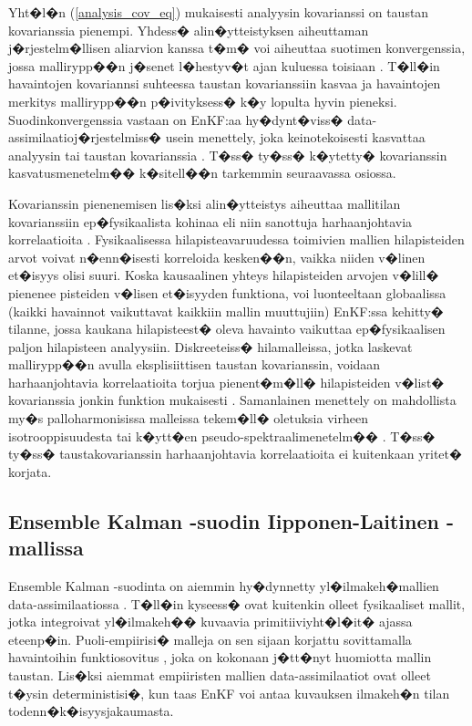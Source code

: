 \documentclass[12pt,a4paper,finnish,margin=2in]{article}
\begin{document}
Yht�l�n (\ref{analysis_cov_eq}) mukaisesti analyysin kovarianssi on taustan kovarianssia pienempi. Yhdess� alin�ytteistyksen aiheuttaman j�rjestelm�llisen aliarvion kanssa t�m� voi aiheuttaa suotimen konvergenssia, jossa mallirypp��n j�senet l�hestyv�t ajan kuluessa toisiaan \citep[esim.][]{hamill_2001}. T�ll�in havaintojen kovariannsi suhteessa taustan kovarianssiin kasvaa ja havaintojen merkitys mallirypp��n p�ivityksess� k�y lopulta hyvin pieneksi. Suodinkonvergenssia vastaan on EnKF:aa hy�dynt�viss� data-assimilaatioj�rjestelmiss� usein menettely, joka keinotekoisesti kasvattaa analyysin tai taustan kovarianssia \citep{whitaker_2002}. T�ss� ty�ss� k�ytetty� kovarianssin kasvatusmenetelm�� k�sitell��n tarkemmin seuraavassa osiossa.

Kovarianssin pienenemisen lis�ksi alin�ytteistys aiheuttaa mallitilan kovarianssiin ep�fysikaalista kohinaa eli niin sanottuja harhaanjohtavia korrelaatioita \citep{evensen_2003}. Fysikaalisessa hilapisteavaruudessa toimivien mallien hilapisteiden arvot voivat n�enn�isesti korreloida kesken��n, vaikka niiden v�linen et�isyys olisi suuri. Koska kausaalinen yhteys hilapisteiden arvojen v�lill� pienenee pisteiden v�lisen et�isyyden funktiona, voi luonteeltaan globaalissa (kaikki havainnot vaikuttavat kaikkiin mallin muuttujiin) EnKF:ssa kehitty� tilanne, jossa kaukana hilapisteest� oleva havainto vaikuttaa ep�fysikaalisen paljon hilapisteen analyysiin. Diskreeteiss� hilamalleissa, jotka laskevat mallirypp��n avulla eksplisiittisen taustan kovarianssin, voidaan harhaanjohtavia korrelaatioita torjua pienent�m�ll� hilapisteiden v�list� kovarianssia jonkin funktion mukaisesti \citep{houtekamer_2001}. Samanlainen menettely on mahdollista my�s palloharmonisissa malleissa tekem�ll� oletuksia virheen isotrooppisuudesta tai k�ytt�en pseudo-spektraalimenetelm�� \citep{buehner_2012}. T�ss� ty�ss� taustakovarianssin harhaanjohtavia korrelaatioita ei kuitenkaan yritet� korjata.

\subsection{Ensemble Kalman -suodin Iipponen-Laitinen -mallissa}

Ensemble Kalman -suodinta on aiemmin hy�dynnetty yl�ilmakeh�mallien data-assimilaatiossa \citep[esim.][]{chen_2016,chartier_2016}. T�ll�in kyseess� ovat kuitenkin olleet fysikaaliset mallit, jotka integroivat yl�ilmakeh�� kuvaavia primitiiviyht�l�it� ajassa eteenp�in. Puoli-empiirisi� malleja on sen sijaan korjattu sovittamalla havaintoihin funktiosovitus \citep{doornbos_2005,Doornbos_2007}, joka on kokonaan j�tt�nyt huomiotta mallin taustan. Lis�ksi aiemmat empiiristen mallien data-assimilaatiot ovat olleet t�ysin deterministisi�, kun taas EnKF voi antaa kuvauksen ilmakeh�n tilan todenn�k�isyysjakaumasta.
\end{document}
